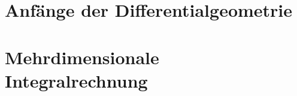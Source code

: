 \documentclass[a4paper,leqno]{article}
\begin{document}
\vspace{1\baselineskip}



\vspace{2\baselineskip}



\pagebreak



\pagebreak



\pagebreak

\section{Anfänge der Differentialgeometrie}

\vspace{1\baselineskip}



\pagebreak



\vspace{1\baselineskip}



\pagebreak

\section{Mehrdimensionale Integralrechnung}

\vspace{1\baselineskip}



\pagebreak



\pagebreak


\end{document}
